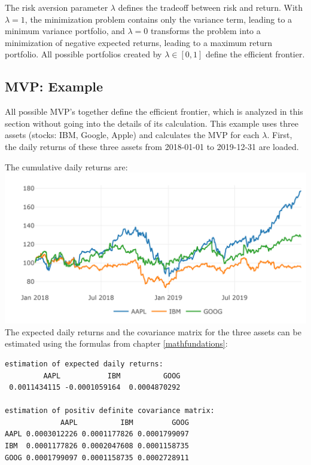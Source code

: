 \documentclass[
  oneside]{book}
\begin{document}
The risk aversion parameter \(\lambda\) defines the tradeoff between risk and return. With \(\lambda = 1\), the minimization problem contains only the variance term, leading to a minimum variance portfolio, and \(\lambda = 0\) transforms the problem into a minimization of negative expected returns, leading to a maximum return portfolio. All possible portfolios created by \(\lambda \in [0, 1]\) define the efficient frontier.

\hypertarget{mvp-example}{%
\subsection{MVP: Example}\label{mvp-example}}

All possible MVP's together define the efficient frontier, which is analyzed in this section without going into the details of its calculation. This example uses three assets (stocks: IBM, Google, Apple) and calculates the MVP for each \(\lambda\). First, the daily returns of these three assets from 2018-01-01 to 2019-12-31 are loaded.

The cumulative daily returns are:\\
\includegraphics{Master_Thesis_files/figure-latex/MVP_ex2-1.png}
The expected daily returns and the covariance matrix for the three assets can be estimated using the formulas from chapter \ref{mathfundations}:

\begin{verbatim}
estimation of expected daily returns:
         AAPL           IBM          GOOG 
 0.0011434115 -0.0001059164  0.0004870292 

estimation of positiv definite covariance matrix:
             AAPL          IBM         GOOG
AAPL 0.0003012226 0.0001177826 0.0001799097
IBM  0.0001177826 0.0002047608 0.0001158735
GOOG 0.0001799097 0.0001158735 0.0002728911
\end{verbatim}
\end{document}
